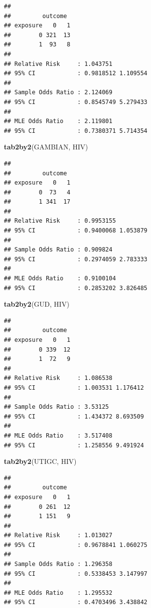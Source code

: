 \documentclass[12pt,a4paper]{book}
\newenvironment{Shaded}{\begin{snugshade}}{\end{snugshade}}
\newcommand{\KeywordTok}[1]{\textcolor[rgb]{0.13,0.29,0.53}{\textbf{#1}}}
\newcommand{\NormalTok}[1]{#1}
\theoremstyle{definition}
\theoremstyle{definition}
\theoremstyle{definition}
\theoremstyle{remark}
\begin{document}
\begin{verbatim}
## 
##         outcome
## exposure   0   1
##        0 321  13
##        1  93   8
## 
## Relative Risk     : 1.043751 
## 95% CI            : 0.9818512 1.109554 
## 
## Sample Odds Ratio : 2.124069 
## 95% CI            : 0.8545749 5.279433 
## 
## MLE Odds Ratio    : 2.119801 
## 95% CI            : 0.7380371 5.714354
\end{verbatim}

\begin{Shaded}
\begin{Highlighting}[]
\KeywordTok{tab2by2}\NormalTok{(GAMBIAN, HIV)}
\end{Highlighting}
\end{Shaded}

\begin{verbatim}
## 
##         outcome
## exposure   0   1
##        0  73   4
##        1 341  17
## 
## Relative Risk     : 0.9953155 
## 95% CI            : 0.9400068 1.053879 
## 
## Sample Odds Ratio : 0.909824 
## 95% CI            : 0.2974059 2.783333 
## 
## MLE Odds Ratio    : 0.9100104 
## 95% CI            : 0.2853202 3.826485
\end{verbatim}

\newpage

\begin{Shaded}
\begin{Highlighting}[]
\KeywordTok{tab2by2}\NormalTok{(GUD, HIV)}
\end{Highlighting}
\end{Shaded}

\begin{verbatim}
## 
##         outcome
## exposure   0   1
##        0 339  12
##        1  72   9
## 
## Relative Risk     : 1.086538 
## 95% CI            : 1.003531 1.176412 
## 
## Sample Odds Ratio : 3.53125 
## 95% CI            : 1.434372 8.693509 
## 
## MLE Odds Ratio    : 3.517408 
## 95% CI            : 1.258556 9.491924
\end{verbatim}

\begin{Shaded}
\begin{Highlighting}[]
\KeywordTok{tab2by2}\NormalTok{(UTIGC, HIV)}
\end{Highlighting}
\end{Shaded}

\begin{verbatim}
## 
##         outcome
## exposure   0   1
##        0 261  12
##        1 151   9
## 
## Relative Risk     : 1.013027 
## 95% CI            : 0.9678841 1.060275 
## 
## Sample Odds Ratio : 1.296358 
## 95% CI            : 0.5338453 3.147997 
## 
## MLE Odds Ratio    : 1.295532 
## 95% CI            : 0.4703496 3.438842
\end{verbatim}
\end{document}
